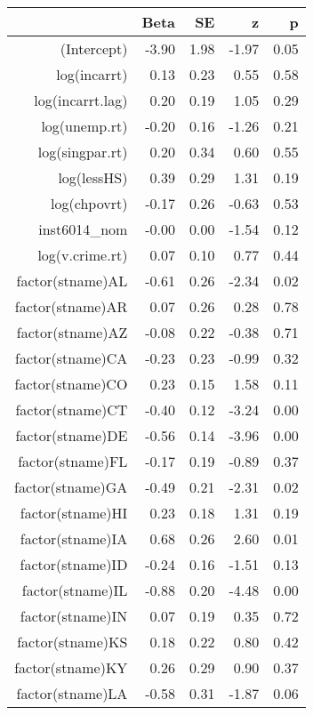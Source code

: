 \begin{table}[ht]
\centering
\begin{tabular}{rrrrr}
  \hline
 & Beta & SE & z & p \\ 
  \hline
(Intercept) & -3.90 & 1.98 & -1.97 & 0.05 \\ 
  log(incarrt) & 0.13 & 0.23 & 0.55 & 0.58 \\ 
  log(incarrt.lag) & 0.20 & 0.19 & 1.05 & 0.29 \\ 
  log(unemp.rt) & -0.20 & 0.16 & -1.26 & 0.21 \\ 
  log(singpar.rt) & 0.20 & 0.34 & 0.60 & 0.55 \\ 
  log(lessHS) & 0.39 & 0.29 & 1.31 & 0.19 \\ 
  log(chpovrt) & -0.17 & 0.26 & -0.63 & 0.53 \\ 
  inst6014\_nom & -0.00 & 0.00 & -1.54 & 0.12 \\ 
  log(v.crime.rt) & 0.07 & 0.10 & 0.77 & 0.44 \\ 
  factor(stname)AL & -0.61 & 0.26 & -2.34 & 0.02 \\ 
  factor(stname)AR & 0.07 & 0.26 & 0.28 & 0.78 \\ 
  factor(stname)AZ & -0.08 & 0.22 & -0.38 & 0.71 \\ 
  factor(stname)CA & -0.23 & 0.23 & -0.99 & 0.32 \\ 
  factor(stname)CO & 0.23 & 0.15 & 1.58 & 0.11 \\ 
  factor(stname)CT & -0.40 & 0.12 & -3.24 & 0.00 \\ 
  factor(stname)DE & -0.56 & 0.14 & -3.96 & 0.00 \\ 
  factor(stname)FL & -0.17 & 0.19 & -0.89 & 0.37 \\ 
  factor(stname)GA & -0.49 & 0.21 & -2.31 & 0.02 \\ 
  factor(stname)HI & 0.23 & 0.18 & 1.31 & 0.19 \\ 
  factor(stname)IA & 0.68 & 0.26 & 2.60 & 0.01 \\ 
  factor(stname)ID & -0.24 & 0.16 & -1.51 & 0.13 \\ 
  factor(stname)IL & -0.88 & 0.20 & -4.48 & 0.00 \\ 
  factor(stname)IN & 0.07 & 0.19 & 0.35 & 0.72 \\ 
  factor(stname)KS & 0.18 & 0.22 & 0.80 & 0.42 \\ 
  factor(stname)KY & 0.26 & 0.29 & 0.90 & 0.37 \\ 
  factor(stname)LA & -0.58 & 0.31 & -1.87 & 0.06 \\ 

\end{tabular}
\end{table}
